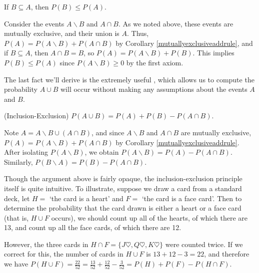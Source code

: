 \par
\begin{thm}\label{monotonicity}
If $B \subseteq A$, then $P(B) \leq P(A)$.
\end{thm}
\begin{pf} Consider the events $A \backslash B$ and $A \cap B$. As we noted above, these events are mutually exclusive, and their union is $A$. Thus, $P(A) = P(A \backslash B) + P(A \cap B)$ by Corollary \ref{mutuallyexclusiveaddrule}, and if $B \subseteq A$, then $A \cap B = B$, so $P(A) = P(A \backslash B) + P(B)$. This implies $P(B) \leq P(A)$ since $P(A \backslash B) \geq 0$ by the first axiom.
\end{pf}
\par
The last fact we'll derive is the extremely useful , which allows us to compute the probability $A \cup B$ will occur without making any assumptions about the events $A$ and $B$.
\par
\begin{thm}
(Inclusion-Exclusion) $P(A \cup B) = P(A) + P(B) - P(A \cap B)$.
\end{thm}
\begin{pf} Note $A = A \backslash B \cup (A \cap B)$, and since $A \backslash B$ and $A \cap B$ are mutually exclusive, $P(A) = P(A \backslash B) + P(A \cap B)$ by Corollary \ref{mutuallyexclusiveaddrule}. After isolating $P(A \backslash B)$, we obtain $P(A \backslash B) = P(A) - P(A \cap B)$. Similarly, $P(B \backslash A) = P(B) - P(A \cap B)$.
\end{pf}
\par
Though the argument above is fairly opaque, the inclusion-exclusion principle itself is quite intuitive. To illustrate, suppose we draw a card from a standard deck, let $H =$ `the card is a heart' and $F =$ `the card is a face card'. Then to determine the probability that the card drawn is either a heart or a face card (that is, $H \cup F$ occurs), we should count up all of the hearts, of which there are 13, and count up all the face cards, of which there are 12. 
\par
However, the three cards in $H \cap F = \{J\heartsuit, Q\heartsuit, K\heartsuit \}$ were counted twice. If we correct for this, the number of cards in $H \cup F$ is $13 + 12 - 3 = 22$, and therefore we have $P(H \cup F) = \frac{22}{52} = \frac{13}{52} + \frac{12}{52} - \frac{3}{52} = P(H) + P(F) - P(H \cap F)$.
